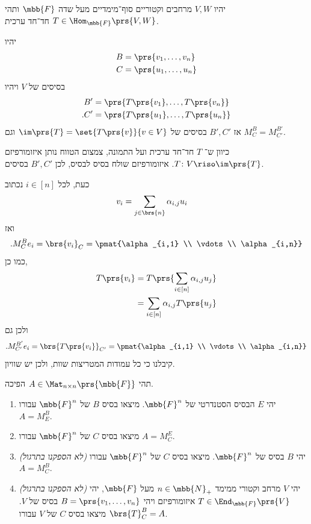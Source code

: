 \documentclass[a4paper,10pt,twoside,openany]{book}
\begin{document}
\begin{exercisechap} \label{exercisechap:change-of-basis-through-isomorphism}
יהיו
$V,W$
מרחבים וקטוריים סוף־מימדיים מעל שדה
$\mbb{F}$
ותהי
$T \in \Hom_{\mbb{F}}\prs{V,W}$
חד־חד ערכית.

יהיו
\begin{align*}
B &= \prs{v_1, \ldots, v_n} \\
C &= \prs{u_1, \ldots, u_n}
\end{align*}
בסיסים של
$V$
ויהיו
\begin{align*}
B' &= \prs{T\prs{v_1}, \ldots, T\prs{v_n}} \\
\text{.} C' &= \prs{T\prs{u_1}, \ldots, T\prs{u_n}}
\end{align*}
אז
$B',C'$
בסיסים של
$\im\prs{T} = \set{T\prs{v}}{v \in V}$
וגם
$M^B_C = M^{B'}_{C'}$.
\end{exercisechap}

\begin{solution}
כיוון ש־%
$T$
חד־חד ערכית ועל התמונה, צמצום הטווח נותן איזומורפיזם
$T \colon V \riso \im\prs{T}$.
איזומורפיזם שולח בסיס לבסיס, לכן
$B',C'$
בסיסים.

כעת, לכל
$i \in [n]$
נכתוב
\begin{align*}
v_i &= \sum_{j \in \brs{n}} \alpha_{i,j} u_i
\end{align*}
ואז
\begin{align*}
\text{.} M^B_C e_i = \brs{v_i}_C = \pmat{\alpha_{i,1} \\ \vdots \\ \alpha_{i,n}}
\end{align*}
כמו כן,
\begin{align*}
T\prs{v_i}
&=
T\prs{\sum_{i \in [n]} \alpha_{i,j} u_j}
\\&=
\sum_{i \in [n]} \alpha_{i,j} T\prs{u_j}
\end{align*}
ולכן גם
\[\text{.} M^{B'}_{C'} e_i = \brs{T\prs{v_i}}_{C'} = \pmat{\alpha_{i,1} \\ \vdots \\ \alpha_{i,n}}\]
קיבלנו כי כל עמודות המטריצות שוות, ולכן יש שוויון.
\end{solution}

\begin{exercisechap}
תהי
$A \in \Mat_{n \times n}\prs{\mbb{F}}$
הפיכה.
\begin{enumerate}
\item יהי
$E$
הבסיס הסטנדרטי של
$\mbb{F}^n$.
מיצאו בסיס
$B$
של
$\mbb{F}^n$
עבורו
$A = M^B_E$.

\item
מיצאו בסיס
$C$
של
$\mbb{F}^n$
עבורו
$A = M^E_C$.

\item \emph{
(לא הספקנו בתרגול)
}
יהי
$B$
בסיס של
$\mbb{F}^n$.
מיצאו בסיס
$C$
של
$\mbb{F}^n$
עבורו
$A = M^B_C$.

\item \emph{
(לא הספקנו בתרגול)
}
יהי
$V$
מרחב וקטורי ממימד
$n \in \mbb{N}_+$
מעל
$\mbb{F}$,
יהי
$T \in \End_{\mbb{F}}\prs{V}$
איזומורפיזם
ויהי
$B = \prs{v_1, \ldots, v_n}$
בסיס של
$V$.
מיצאו בסיס
$C$
של
$V$
עבורו
$\brs{T}^B_C = A$.
\end{enumerate}
\end{exercisechap}
\end{document}
